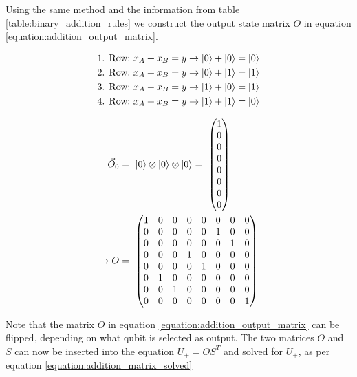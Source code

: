 Using the same method and the information from table \ref{table:binary_addition_rules} we construct the output state matrix $O$ in equation \ref{equation:addition_output_matrix}.

\begin{equation}
    \begin{split}
        \text{1. Row:}\ x_{A} + x_{B} = y \rightarrow \ket{0} + \ket{0} = \ket{0}\\    
        \text{2. Row:}\ x_{A} + x_{B} = y \rightarrow \ket{0} + \ket{1} = \ket{1}\\    
        \text{3. Row:}\ x_{A} + x_{B} = y \rightarrow \ket{1} + \ket{0} = \ket{1}\\    
        \text{4. Row:}\ x_{A} + x_{B} = y \rightarrow \ket{1} + \ket{1} = \ket{0}\\    
    \end{split}
\end{equation}

\begin{equation}
\centering
    \begin{split}
        \vec{O}_0 &=\ \ket{0} \otimes \ket{0} \otimes \ket{0} =\ \begin{pmatrix}1 \\0 \\0 \\0 \\0 \\0 \\0 \\0 \end{pmatrix} \\
        \rightarrow O &=\ \begin{pmatrix}
        1 & 0 & 0 & 0 & 0 & 0 & 0 & 0\\
        0 & 0 & 0 & 0 & 0 & 1 & 0 & 0\\
        0 & 0 & 0 & 0 & 0 & 0 & 1 & 0\\
        0 & 0 & 0 & 1 & 0 & 0 & 0 & 0\\
        0 & 0 & 0 & 0 & 1 & 0 & 0 & 0\\
        0 & 1 & 0 & 0 & 0 & 0 & 0 & 0\\
        0 & 0 & 1 & 0 & 0 & 0 & 0 & 0\\
        0 & 0 & 0 & 0 & 0 & 0 & 0 &1
        \end{pmatrix}
    \end{split}
    \label{equation:addition_output_matrix}
\end{equation}

Note that the matrix $O$ in equation \ref{equation:addition_output_matrix} can be flipped, depending on what qubit is selected as output. The two matrices $O$ and $S$ can now be inserted into the equation $U_{+} = OS^T$ and solved for $U_{+}$, as per equation \ref{equation:addition_matrix_solved}

